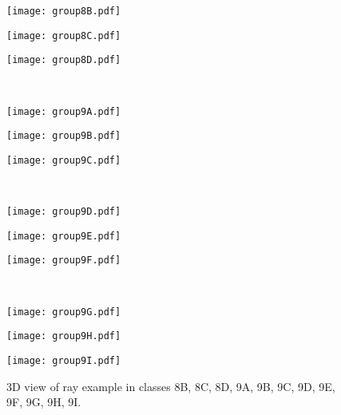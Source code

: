 \begin{figure}[htps]
\centering
\begin{minipage}[c]{0.325\textwidth}
\texttt{[image: group8B.pdf]}
\end{minipage}
\begin{minipage}[c]{0.325\textwidth}
\texttt{[image: group8C.pdf]}
\end{minipage}
\begin{minipage}[c]{0.325\textwidth}
\texttt{[image: group8D.pdf]}
\end{minipage}\\

\begin{minipage}[c]{0.325\textwidth}
\texttt{[image: group9A.pdf]}
\end{minipage}
\begin{minipage}[c]{0.325\textwidth}
\texttt{[image: group9B.pdf]}
\end{minipage}
\begin{minipage}[c]{0.325\textwidth}
\texttt{[image: group9C.pdf]}
\end{minipage}\\

\begin{minipage}[c]{0.325\textwidth}
\texttt{[image: group9D.pdf]}
\end{minipage}
\begin{minipage}[c]{0.325\textwidth}
\texttt{[image: group9E.pdf]}
\end{minipage}
\begin{minipage}[c]{0.325\textwidth}
\texttt{[image: group9F.pdf]}
\end{minipage}\\

\begin{minipage}[c]{0.325\textwidth}
\texttt{[image: group9G.pdf]}
\end{minipage}
\begin{minipage}[c]{0.325\textwidth}
\texttt{[image: group9H.pdf]}
\end{minipage}
\begin{minipage}[c]{0.325\textwidth}
\texttt{[image: group9I.pdf]}
\end{minipage}

\caption{3D view of ray example in classes 8B, 8C, 8D, 9A, 9B, 9C, 9D, 9E, 9F, 9G, 9H, 9I.}
\label{fig:modelClass3D1}
\end{figure}








